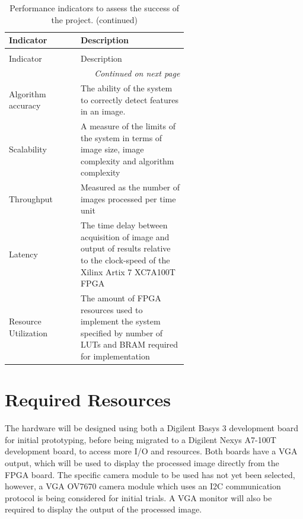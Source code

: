 \begin{center}
    \small
    \begin{longtable}{lp{0.6\linewidth}}
        \caption{Table of performance indicators.} \label{tab:performance}\\
        \toprule
        Indicator & Description \\
        \midrule
        \endfirsthead
        
        \caption{Performance indicators to assess the success of the project. (continued)} \\
        \toprule
        Indicator & Description \\
        \midrule
        \endhead
        
        \bottomrule
        \multicolumn{2}{r}{\textit{Continued on next page}} \\
        \endfoot
        
        \bottomrule
        \endlastfoot
        
        Algorithm accuracy      & The ability of the system to correctly detect features in an image. \\
        Scalability             & A measure of the limits of the system in terms of image size, image complexity and algorithm complexity \\
        Throughput              & Measured as the number of images processed per time unit \\
        Latency                 & The time delay between acquisition of image and output of results relative to the clock-speed of the Xilinx Artix 7 XC7A100T FPGA \\
        Resource Utilization    & The amount of FPGA resources used to implement the system specified by number of LUTs and BRAM required for implementation \\
    \end{longtable}
\end{center}

\section{Required Resources}
The hardware will be designed using both a Digilent Basys 3 development board for initial prototyping, before being migrated to a Digilent Nexys A7-100T development board, to access more I/O and resources. 
Both boards have a VGA output, which will be used to display the processed image directly from the FPGA board. 
The specific camera module to be used has not yet been selected, however, a VGA OV7670 camera module which uses an I2C communication protocol is being considered for initial trials.
A VGA monitor will also be required to display the output of the processed image.

